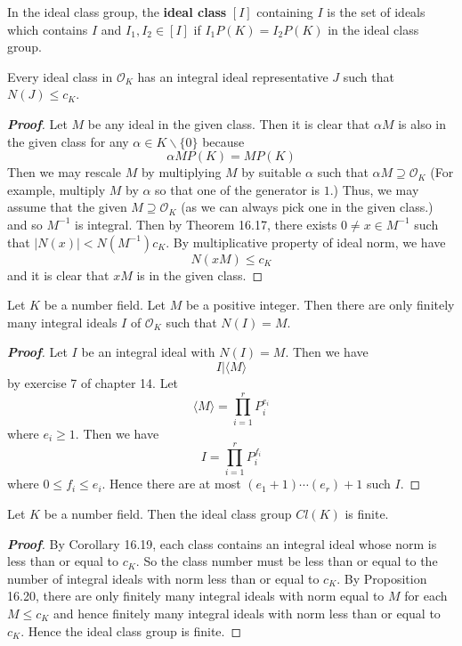 \begin{definition} In the ideal class group, the {\bf ideal class} $[I]$ containing $I$ is the set of ideals
which contains $I$ and $I_1,I_2 \in [I]$ if $I_1P(K)=I_2P(K)$ in the ideal class group.
\end{definition}
\begin{corollary} Every ideal class in $\mathcal{O}_K$ has an integral ideal representative $J$ such that
$N(J) \le c_K$.
\end{corollary}
\begin{proof}[\bf Proof] Let $M$ be any ideal in the given class. Then it is clear that $\alpha M$ is also in the given class for any $\alpha \in K\backslash \{0\}$ because
$$\alpha M P(K)=MP(K)$$
Then we may rescale $M$ by multiplying $M$ by suitable $\alpha$ such that $\alpha M \supseteq \mathcal{O}_K$
(For example, multiply $M$ by $\alpha$ so that one of the generator is $1$.) Thus, we may assume that the given
$M \supseteq \mathcal{O}_K$ (as we can always pick one in the given class.) and so $M^{-1}$ is integral.
Then by Theorem 16.17, there exists $0 \neq x \in M^{-1}$ such that $|N(x)|<N(M^{-1})c_K$.
By multiplicative property of ideal norm, we have
$$N(xM) \le c_K$$
and it is clear that $xM$ is in the given class.
\end{proof}
\begin{proposition} Let $K$ be a number field. Let $M$ be a positive integer. Then there are only finitely many integral ideals $I$ of $\mathcal{O}_K$ such that $N(I)=M$.
\end{proposition}
\begin{proof}[\bf Proof] Let $I$ be an integral ideal with $N(I)=M$. Then we have
$$I \big|\langle M \rangle$$ by exercise 7 of chapter 14.
Let
$$\langle M \rangle=\prod_{i=1}^r P^{e_i}_i$$
where $e_i \ge 1$. Then we have
$$I=\prod_{i=1}^r P^{f_i}_i$$
where $0 \le f_i \le e_i$. Hence there are at most $(e_1+1)\cdots(e_r)+1$ such $I$.
\end{proof}
\begin{theorem} Let $K$ be a number field. Then the ideal class group $Cl(K)$ is finite.
\end{theorem}
\begin{proof}[\bf Proof]  By Corollary 16.19, each class contains an integral ideal whose norm is less than or equal to $c_K$.
So the class number must be less than or equal to the number of integral ideals with norm less than or equal to $c_K$. By Proposition 16.20, there are only finitely many integral ideals with norm equal to $M$ for each $M \le c_K$ and hence finitely many integral ideals with norm less than or equal to $c_K$.
Hence the ideal class group is finite.
\end{proof}

